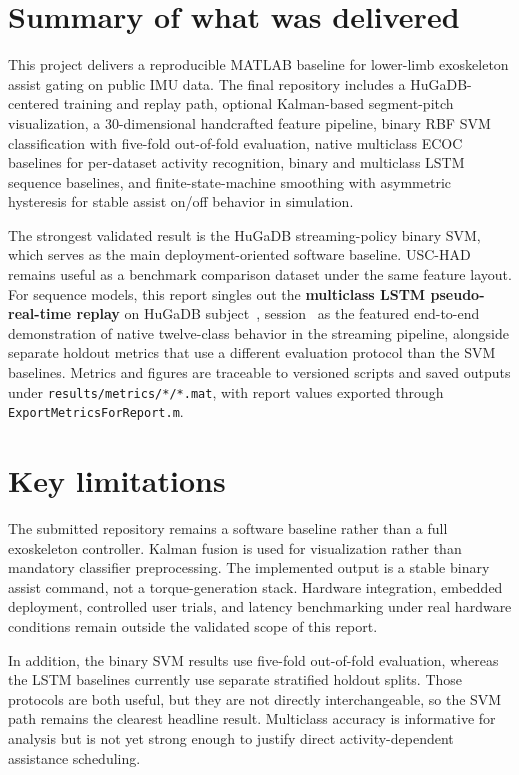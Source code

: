 \section{Summary of what was delivered}
This project delivers a reproducible MATLAB baseline for lower-limb exoskeleton assist gating on public IMU data. The final repository includes a HuGaDB-centered training and replay path, optional Kalman-based segment-pitch visualization, a 30-dimensional handcrafted feature pipeline, binary RBF SVM classification with five-fold out-of-fold evaluation, native multiclass ECOC baselines for per-dataset activity recognition, binary and multiclass LSTM sequence baselines, and finite-state-machine smoothing with asymmetric hysteresis for stable assist on/off behavior in simulation.

The strongest validated result is the HuGaDB streaming-policy binary SVM, which serves as the main deployment-oriented software baseline. USC-HAD remains useful as a benchmark comparison dataset under the same feature layout. For sequence models, this report singles out the \textbf{multiclass LSTM pseudo-real-time replay} on HuGaDB subject~\ReplayHuGaDBSubject{}, session~\ReplayHuGaDBSession{} as the featured end-to-end demonstration of native twelve-class behavior in the streaming pipeline, alongside separate holdout metrics that use a different evaluation protocol than the SVM baselines. Metrics and figures are traceable to versioned scripts and saved outputs under \texttt{results/metrics/*/*.mat}, with report values exported through \texttt{ExportMetricsForReport.m}.

\section{Key limitations}
The submitted repository remains a software baseline rather than a full exoskeleton controller. Kalman fusion is used for visualization rather than mandatory classifier preprocessing. The implemented output is a stable binary assist command, not a torque-generation stack. Hardware integration, embedded deployment, controlled user trials, and latency benchmarking under real hardware conditions remain outside the validated scope of this report.

In addition, the binary SVM results use five-fold out-of-fold evaluation, whereas the LSTM baselines currently use separate stratified holdout splits. Those protocols are both useful, but they are not directly interchangeable, so the SVM path remains the clearest headline result. Multiclass accuracy is informative for analysis but is not yet strong enough to justify direct activity-dependent assistance scheduling.

